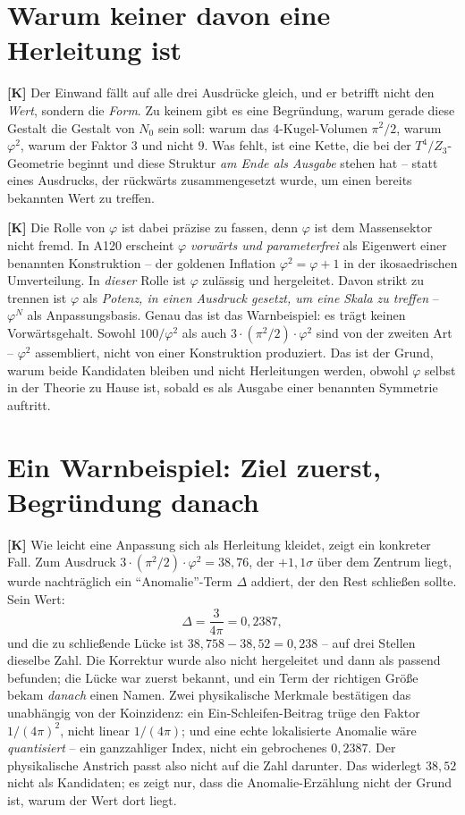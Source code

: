 \section{Warum keiner davon eine Herleitung ist}

\textbf{[K]} Der Einwand fällt auf alle drei Ausdrücke gleich, und er betrifft
nicht den \emph{Wert}, sondern die \emph{Form}. Zu keinem gibt es eine
Begründung, warum gerade diese Gestalt die Gestalt von $N_0$ sein soll: warum
das $4$-Kugel-Volumen $\pi^2/2$, warum $\varphi^2$, warum der Faktor $3$ und
nicht $9$. Was fehlt, ist eine Kette, die bei der $T^4/Z_3$-Geometrie beginnt
und diese Struktur \emph{am Ende als Ausgabe} stehen hat -- statt eines
Ausdrucks, der rückwärts zusammengesetzt wurde, um einen bereits bekannten Wert
zu treffen.

\textbf{[K]} Die Rolle von $\varphi$ ist dabei präzise zu fassen, denn $\varphi$
ist dem Massensektor nicht fremd. In A120 erscheint $\varphi$ \emph{vorwärts und
parameterfrei} als Eigenwert einer benannten Konstruktion -- der goldenen
Inflation $\varphi^2 = \varphi + 1$ in der ikosaedrischen Umverteilung. In
\emph{dieser} Rolle ist $\varphi$ zulässig und hergeleitet. Davon strikt zu
trennen ist $\varphi$ als \emph{Potenz, in einen Ausdruck gesetzt, um eine Skala
zu treffen} -- $\varphi^N$ als Anpassungsbasis. Genau das ist das Warnbeispiel:
es trägt keinen Vorwärtsgehalt. Sowohl $100/\varphi^2$ als auch
$3\cdot(\pi^2/2)\cdot\varphi^2$ sind von der zweiten Art -- $\varphi^2$
assembliert, nicht von einer Konstruktion produziert. Das ist der Grund, warum
beide Kandidaten bleiben und nicht Herleitungen werden, obwohl $\varphi$ selbst
in der Theorie zu Hause ist, sobald es als Ausgabe einer benannten Symmetrie
auftritt.

\section{Ein Warnbeispiel: Ziel zuerst, Begründung danach}

\textbf{[K]} Wie leicht eine Anpassung sich als Herleitung kleidet, zeigt ein
konkreter Fall. Zum Ausdruck $3\cdot(\pi^2/2)\cdot\varphi^2 = 38{,}76$, der
$+1{,}1\sigma$ über dem Zentrum liegt, wurde nachträglich ein
\enquote{Anomalie}-Term $\Delta$ addiert, der den Rest schließen sollte. Sein
Wert:
\[
  \Delta = \frac{3}{4\pi} = 0{,}2387 ,
\]
und die zu schließende Lücke ist $38{,}758 - 38{,}52 = 0{,}238$ -- auf drei
Stellen dieselbe Zahl. Die Korrektur wurde also nicht hergeleitet und dann als
passend befunden; die Lücke war zuerst bekannt, und ein Term der richtigen Größe
bekam \emph{danach} einen Namen. Zwei physikalische Merkmale bestätigen das
unabhängig von der Koinzidenz: ein Ein-Schleifen-Beitrag trüge den Faktor
$1/(4\pi)^2$, nicht linear $1/(4\pi)$; und eine echte lokalisierte Anomalie wäre
\emph{quantisiert} -- ein ganzzahliger Index, nicht ein gebrochenes $0{,}2387$.
Der physikalische Anstrich passt also nicht auf die Zahl darunter. Das widerlegt
$38{,}52$ nicht als Kandidaten; es zeigt nur, dass die Anomalie-Erzählung nicht
der Grund ist, warum der Wert dort liegt.

